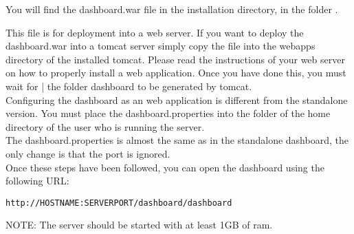 You will find the dashboard.war file in the installation directory, in the folder .

This file is for deployment into a web server. If you want to deploy the dashboard.war into a tomcat server simply copy the file into the webapps directory of the installed tomcat. Please read the instructions of your web server on how to properly install a web application. Once you have done this, you must wait for | the folder dashboard to be generated by tomcat. \\
Configuring the dashboard as an web application is different from the standalone version. You must place the dashboard.properties into the  folder of the home directory of the user who is running the server.\\
The dashboard.properties is almost the same as in the standalone dashboard, the only change is that the port is ignored. \\
Once these steps have been followed, you can open the dashboard using the following URL:
\begin{verbatim}
http://HOSTNAME:SERVERPORT/dashboard/dashboard
\end{verbatim}

NOTE: The server should be started with at least 1GB of ram.